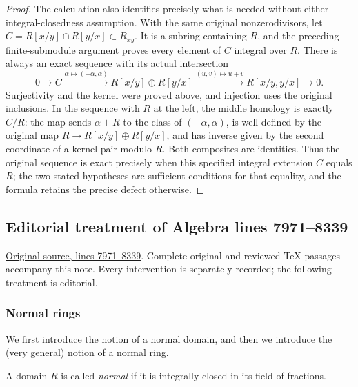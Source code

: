 \begin{proof}
The calculation also identifies precisely what is needed without
either integral-closedness assumption. With the same original
nonzerodivisors, let $C=R[x/y]\cap R[y/x]\subset R_{xy}$.
It is a subring containing $R$, and the preceding finite-submodule
argument proves every element of $C$ integral over $R$.
There is always an exact sequence with its actual intersection
$$
0\longrightarrow C\xrightarrow{\alpha\mapsto(-\alpha,\alpha)}
R[x/y]\oplus R[y/x]\xrightarrow{(u,v)\mapsto u+v}
R[x/y,y/x]\longrightarrow0.
$$
Surjectivity and the kernel were proved above, and injection uses
the original inclusions. In the sequence with $R$ at the left,
the middle homology is exactly $C/R$: the map sends
$\alpha+R$ to the class of $(-\alpha,\alpha)$, is well defined
by the original map $R\to R[x/y]\oplus R[y/x]$, and has inverse
given by the second coordinate of a kernel pair modulo $R$.
Both composites are identities. Thus the original sequence is
exact precisely when this specified integral extension $C$ equals
$R$; the two stated hypotheses are sufficient conditions for that
equality, and the formula retains the precise defect otherwise.
\end{proof}


\subsection{Editorial treatment of Algebra lines 7971--8339}

\hypertarget{algebra-context-089}{}

\noindent\href{https://github.com/stacks/stacks-project/blob/a04446e57ec1fbc252a871afcec7752fb2807b14/algebra.tex\#L7971}{Original source, lines 7971--8339}. Complete original and reviewed TeX passages accompany this note. Every intervention is separately recorded; the following treatment is editorial.


\subsubsection{Normal rings}
\label{editorial-source-section-normal-rings}

\noindent
We first introduce the notion of a normal domain, and then we
introduce the (very general) notion of a normal ring.

\begin{definition}
\label{editorial-source-definition-domain-normal}
A domain $R$ is called {\it normal} if it is integrally
closed in its field of fractions.
\end{definition}

